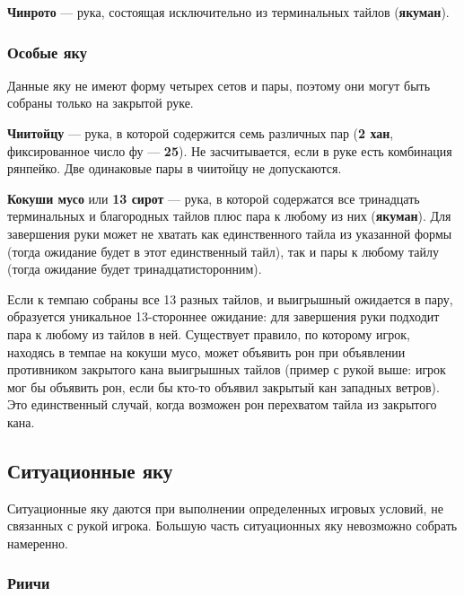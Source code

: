  \hfill {}

\textbf{Чинрото} --- рука, состоящая исключительно из терминальных тайлов (\textbf{якуман}).

 \hfill {}

\subsubsection{Особые яку}

Данные яку не имеют форму четырех сетов и пары, поэтому они могут быть собраны только на закрытой руке.

\textbf{Чиитойцу} --- рука, в которой содержится семь различных пар (\textbf{2 хан}, фиксированное число фу --- \textbf{25}). Не засчитывается, если в руке есть комбинация рянпейко. Две одинаковые пары в чиитойцу не допускаются.


\textbf{Кокуши мусо} или \textbf{13 сирот} --- рука, в которой содержатся все тринадцать терминальных и благородных тайлов плюс пара к любому из них (\textbf{якуман}). Для завершения руки может не хватать как единственного тайла из указанной формы (тогда ожидание будет в этот единственный тайл), так и пары к любому тайлу (тогда ожидание будет тринадцатисторонним).

Если к темпаю собраны все 13 разных тайлов, и выигрышный ожидается в пару, образуется уникальное 13-стороннее ожидание: для завершения руки подходит пара к любому из тайлов в ней.  Существует правило, по которому игрок, находясь в темпае на кокуши мусо, может объявить рон при объявлении противником закрытого кана выигрышных тайлов (пример с рукой выше: игрок мог бы объявить рон, если бы кто-то объявил закрытый кан западных ветров). Это единственный случай, когда возможен рон перехватом тайла из закрытого кана.


\subsection{Ситуационные яку}

Ситуационные яку даются при выполнении определенных игровых условий, не связанных с рукой игрока. Большую часть ситуационных яку невозможно собрать намеренно.

\subsubsection{Риичи}

